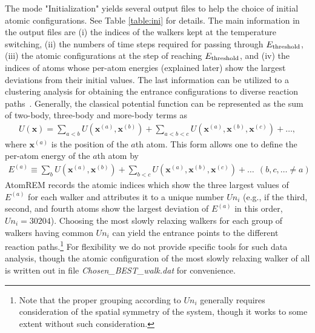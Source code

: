 \documentclass[preprint,12pt]{elsarticle}
\begin{document}
The mode "Initialization" yields several output files to help the choice of initial atomic configurations. See Table \ref{table:ini} for details. The main information in the output files are (i) the indices of the walkers kept at the temperature switching, (ii) the numbers of time steps required for passing through $E_{\rm threshold}$, (iii) the atomic configurations at the step of reaching $E_{\rm threshold}$, and (iv) the indices of atoms whose per-atom energies (explained later) show the largest deviations from their initial values. The last information can be utilized to a clustering analysis for obtaining the entrance configurations to diverse reaction paths~\cite{Nagornov}. Generally, the classical potential function can be represented as the sum of two-body, three-body and more-body terms as
\begin{eqnarray}
U({\bm x})
=\sum_{a<b}U({\bm x}^{(a)}, {\bm x}^{(b)})+\sum_{a<b<c}U({\bm x}^{(a)}, {\bm x}^{(b)}, {\bm x}^{(c)})+\dots,
\end{eqnarray}
where ${\bm x}^{(a)}$ is the position of the $a$th atom. This form allows one to define the per-atom energy of the $a$th atom by
\begin{eqnarray}
E^{(a)}
\equiv
\sum_{b}U({\bm x}^{(a)}, {\bm x}^{(b)})+\sum_{b<c}U({\bm x}^{(a)}, {\bm x}^{(b)}, {\bm x}^{(c)})+\dots \ \  (b, c, \dots \neq a )
\end{eqnarray} 
AtomREM records the atomic indices which show the three largest values of $E^{(a)}$ for each walker and attributes it to a unique number $Un_{i}$ (e.g., if the third, second, and fourth atoms show the largest deviation of $E^{(a)}$ in this order, $Un_{i}=30204$). Choosing the most slowly relaxing walkers for each group of walkers having common $Un_{i}$ can yield the entrance points to the different reaction paths.\footnote{Note that the proper grouping according to $Un_{i}$ generally requires consideration of the spatial symmetry of the system, though it works to some extent without such consideration.} For flexibility we do not provide specific tools for such data analysis, though the atomic configuration of the most slowly relaxing walker of all is written out in file {\it Chosen\_BEST\_walk.dat} for convenience.

\end{document}
